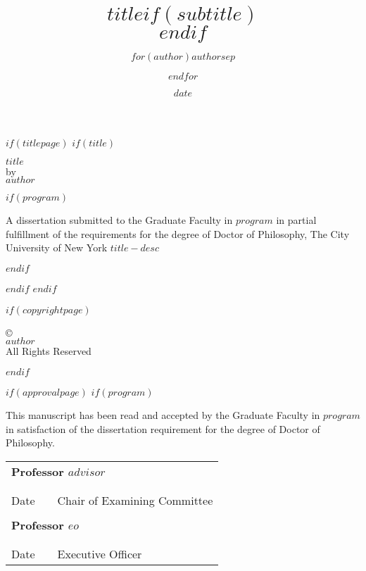 \documentclass[$if(draft)$$draft$,$endif$$if(fontsize)$$fontsize$,$endif$$if(lang)$$babel-lang$,$endif$$if(papersize)$$papersize$,$endif$$if(sides)$$sides$,$endif$$for(classoption)$$classoption$$sep$,$endfor$]{$documentclass$}
\title{$title$$if(subtitle)$\\\vspace{0.5em}{\large $subtitle$}$endif$}
\author{$for(author)$$author$$sep$ \and $endfor$}
\date{$date$}
\begin{document}
\frontmatter
$if(titlepage)$
$if(title)$
\begin{titlepage}
\begin{center}
\vspace{2in}
\textsc{$title$} \\[0.5in]
by \\[0.5in]
\textsc{$author$}\par
\vspace{\fill}
$if(program)$
\begin{raggedright}
A dissertation submitted to the Graduate Faculty in $program$ in partial fulfillment of the requirements for the degree of Doctor of Philosophy, The City University of New York
$title-desc$\\[0.25in]
\end{raggedright}\par
$endif$

\number\year

\end{center}
\end{titlepage}
\setcounter{page}{2}
$endif$
$endif$

$if(copyrightpage)$
\phantom{}\vspace{\fill}
\begin{center}
\copyright\number\year\\
\textsc{$author$}\\
All Rights Reserved\\
\end{center}
$endif$

$if(approvalpage)$
$if(program)$
\newpage
\begin{center}
This manuscript has been read and accepted by the Graduate Faculty in $program$ in satisfaction of the dissertation requirement for the degree of Doctor of Philosophy.
\end{center}

\vspace{0.75in}

\setlength{\tabcolsep}{0pt}
\begin{tabular}{p{1.75in}p{0.5in}p{3.5in}}
\multicolumn{3}{l}{\textbf{Professor $advisor$}}\\
\\
\hrulefill& &\hrulefill \\
Date & & Chair of Examining Committee\\
\\
\multicolumn{3}{l}{\textbf{Professor $eo$}}\\
\\
\hrulefill& &\hrulefill \\
Date & & Executive Officer\\
\end{tabular}
\end{document}
